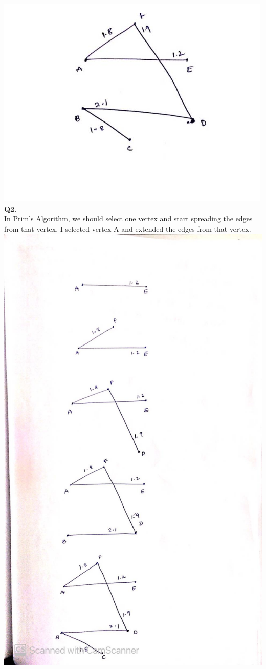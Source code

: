 \documentclass[11pt]{article}
\begin{document}
\includegraphics[scale=0.6]{wh.png}
\vspace{5mm}
\hline
\vspace{5mm}
\textbf{Q2}.\\
In Prim's Algorithm, we should select one vertex and start spreading the edges from that vertex. I selected vertex A and extended the edges from that vertex.
\includegraphics[scale=0.3]{WhatsApp Image 2020-04-19 at 8.59.23 PM.jpeg}
\end{document}
